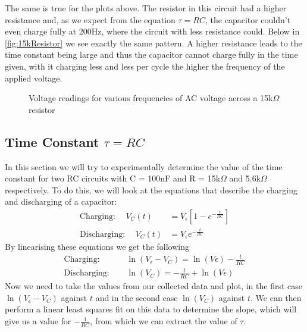 \documentclass[12pt]{article}
\numberwithin{equation}{section}
\numberwithin{figure}{section}
\begin{document}
    The same is true for the plots above. The resistor in this circuit had a higher resistance and, as 
    we expect from the equation $\tau=RC$, the capacitor couldn't even charge fully at 200Hz, where the 
    circuit with less resistance could. \newline
    \newline
    Below in \autoref{fig:15kResistor} we see exactly the same pattern. A higher resistance leads to the 
    time constant being large and thus the capacitor cannot charge fully in the time given, with it charging 
    less and less per cycle the higher the frequency of the applied voltage.
    
    \begin{figure}[H]%
        \centering
        \qquad
        \qquad
        \qquad
        \caption{Voltage readings for various frequencies of AC voltage across a 15k$\Omega$ resistor}
        \label{fig:15kResistor}
    \end{figure}

    \subsection{Time Constant \texorpdfstring{$\tau=RC$}{t=RC}}
    In this section we will try to experimentally determine the value of the time constant for two RC circuits 
    with C = 100nF and R = 15k$\Omega$ and 5.6k$\Omega$ respectively. To do this, we will look at the equations 
    that describe the charging and discharging of a capacitor:
    \begin{align}
        \text{Charging:}\hspace{15pt} V_C(t)&=V_\epsilon[1-e^{-\frac{t}{RC}}] \label{eqn:CapCharging}\\
        \text{Discharging:}\hspace{15pt} V_C(t)&=V_\epsilon e^{-\frac{t}{RC}} \label{eqn:CapDischarging}
    \end{align}
    By linearising these equations we get the following
    \begin{align}
        \text{Charging:}\hspace{15pt} &\ln(V_\epsilon-V_C)=\ln(V\epsilon)-\frac{t}{RC} \label{eqn:CapChargingLinearised}\\
        \text{Discharging:}\hspace{15pt} &\ln(V_C)=-\frac{t}{RC}+\ln(V\epsilon) \label{eqn:CapDischargingLinearised}
    \end{align}
    Now we need to take the values from our collected data and plot, in the first case $\ln(V_\epsilon-V_C)$ 
    against $t$ and in the second case $\ln(V_C)$ against $t$. We can then perform a linear least squares fit 
    on this data to determine the slope, which will give us a value for $-\frac{1}{RC}$, from which we can extract the
    value of $\tau$.
\end{document}
